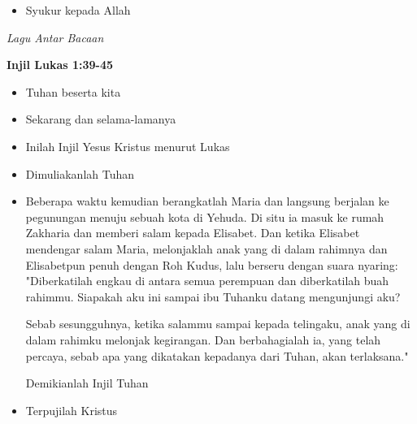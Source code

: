 \documentclass[a5paper,headsepline,titlepage,10pt,nnormalheadings,DIVcalc,twoside]{scrbook}
\makeatletter
\newcommand{\subjudul}[1]{%
  {\parindent \z@ 
    \interlinepenalty\@M \bfseries #1\par\nobreak \vskip 10\p@ }}
\newcommand{\lagu}[1]{%
  {\parindent \z@ 
    \interlinepenalty\@M \slshape \mdseries \Large \textit{#1}\par\nobreak \vskip 10\p@ }}
\newcommand{\BU}[1]{\begin{itemize} \item[U:] #1 \end{itemize}}
\newcommand{\BI}[1]{\begin{itemize} \item[I:] #1 \end{itemize}}
\newcommand{\BP}[1]{\begin{itemize} \item[P:] #1 \end{itemize}}
\makeatother
\begin{document}
\BU{Syukur kepada Allah}

 

\lagu{Lagu Antar Bacaan}


\subjudul{Injil Lukas 1:39-45}

\BI{Tuhan beserta kita}

\BU{Sekarang dan selama-lamanya} 

\BI{Inilah Injil Yesus Kristus menurut Lukas}

\BU{Dimuliakanlah Tuhan}

\BP{Beberapa waktu kemudian berangkatlah Maria dan langsung berjalan ke pegunungan menuju sebuah kota di Yehuda.
Di situ ia masuk ke rumah Zakharia dan memberi salam kepada Elisabet.
Dan ketika Elisabet mendengar salam Maria, melonjaklah anak yang di dalam rahimnya dan Elisabetpun penuh dengan Roh Kudus,
lalu berseru dengan suara nyaring: "Diberkatilah engkau di antara semua perempuan dan diberkatilah buah rahimmu.
Siapakah aku ini sampai ibu Tuhanku datang mengunjungi aku?

Sebab sesungguhnya, ketika salammu sampai kepada telingaku, anak yang di dalam rahimku melonjak kegirangan.
Dan berbahagialah ia, yang telah percaya, sebab apa yang dikatakan kepadanya dari Tuhan, akan terlaksana."

Demikianlah Injil Tuhan}

\BU{Terpujilah Kristus}

 
\end{document}
